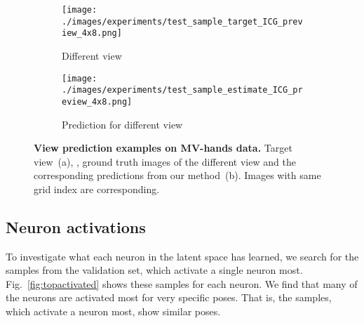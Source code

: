 \documentclass[10pt,twocolumn,letterpaper]{article}
\begin{document}
\begin{figure*}[t]
  \centering
  \begin{subfigure}{0.48\textwidth}
    \texttt{[image: ./images/experiments/test\_sample\_target\_ICG\_preview\_4x8.png]}
    \caption{Different view}
  \end{subfigure}
  \quad
  \begin{subfigure}{0.48\textwidth}
    \texttt{[image: ./images/experiments/test\_sample\_estimate\_ICG\_preview\_4x8.png]}
    \caption{Prediction for different view}
  \end{subfigure}
  \caption{\textbf{View prediction examples on MV-hands data.}
  Target view~(a), \ie, ground truth images of the different view 
  and the corresponding predictions from our method~(b).
  Images with same grid index are corresponding.}
  \label{fig:predictedviewsmvhands}
\end{figure*}\vspace{0.7em}\subsection{Neuron activations}\label{sup:sec:neuronactivations}
To investigate what each neuron in the latent space has learned,
we search for the samples from the validation set, which activate a single neuron most.
Fig.~\ref{fig:topactivated} shows these samples for each neuron.
We find that many of the neurons are activated most for very specific poses.
That is, the samples, which activate a neuron most, show similar poses.
\end{document}
